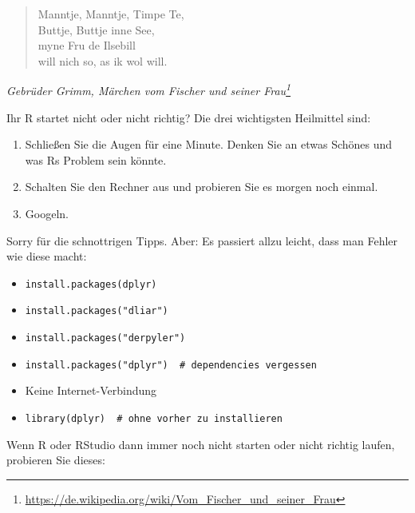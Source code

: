 \documentclass[12pt,]{book}
\providecommand{\tightlist}{%
  \setlength{\itemsep}{0pt}\setlength{\parskip}{0pt}}
\begin{document}
\begin{quote}
Manntje, Manntje, Timpe Te,\\
Buttje, Buttje inne See,\\
myne Fru de Ilsebill\\
will nich so, as ik wol will.
\end{quote}

\emph{Gebrüder Grimm, Märchen vom Fischer und seiner Frau\footnote{\url{https://de.wikipedia.org/wiki/Vom_Fischer_und_seiner_Frau}}}

Ihr R startet nicht oder nicht richtig? Die drei wichtigsten Heilmittel
sind:

\begin{enumerate}
\def\labelenumi{\arabic{enumi}.}
\tightlist
\item
  Schließen Sie die Augen für eine Minute. Denken Sie an etwas Schönes
  und was Rs Problem sein könnte.
\item
  Schalten Sie den Rechner aus und probieren Sie es morgen noch einmal.
\item
  Googeln.
\end{enumerate}

Sorry für die schnottrigen Tipps. Aber: Es passiert allzu leicht, dass
man Fehler wie diese macht:

\begin{itemize}
\tightlist
\item
  \texttt{install.packages(dplyr)}
\item
  \texttt{install.packages("dliar")}
\item
  \texttt{install.packages("derpyler")}
\item
  \texttt{install.packages("dplyr")\ \ \#\ dependencies\ vergessen}
\item
  Keine Internet-Verbindung
\item
  \texttt{library(dplyr)\ \ \#\ ohne\ vorher\ zu\ installieren}
\end{itemize}

Wenn R oder RStudio dann immer noch nicht starten oder nicht richtig
laufen, probieren Sie dieses:
\end{document}
